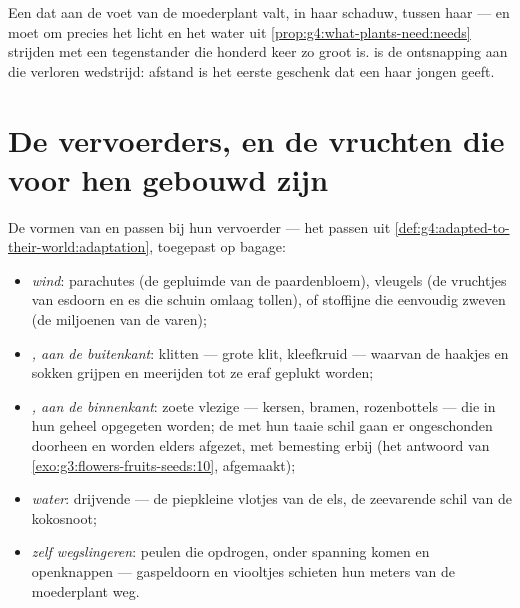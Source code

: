 \begin{example}\label{ex:g6:how-plants-spread:whyleave}
Een  dat aan de voet van de moederplant valt,  in haar
schaduw, tussen haar  --- en moet om precies het licht en het
water uit \cref{prop:g4:what-plants-need:needs} strijden met een
tegenstander die honderd keer zo groot is.  is de ontsnapping
aan die verloren wedstrijd: afstand is het eerste geschenk dat een 
haar jongen geeft.
\end{example}

\section{De vervoerders, en de vruchten die voor hen gebouwd zijn}

\begin{proposition}\label{prop:g6:how-plants-spread:builds}
De vormen van  en  passen bij hun vervoerder --- het passen
uit \cref{def:g4:adapted-to-their-world:adaptation}, toegepast op bagage:
\begin{itemize}
  \item \emph{wind}: parachutes (de gepluimde  van de
        paardenbloem), vleugels (de vruchtjes van esdoorn en es die
        schuin omlaag tollen), of stoffijne  die eenvoudig zweven
        (de miljoenen van de varen);
  \item \emph{, aan de buitenkant}: klitten --- grote klit,
        kleefkruid --- waarvan de haakjes  en sokken grijpen en
        meerijden tot ze eraf geplukt worden;
  \item \emph{, aan de binnenkant}: zoete vlezige  ---
        kersen, bramen, rozenbottels --- die in hun geheel opgegeten
        worden; de  met hun taaie schil gaan er ongeschonden
        doorheen en worden elders afgezet, met bemesting erbij
        (het antwoord van \cref{exo:g3:flowers-fruits-seeds:10},
        afgemaakt);
  \item \emph{water}: drijvende  --- de piepkleine vlotjes van
        de els, de zeevarende schil van de kokosnoot;
  \item \emph{zelf wegslingeren}: peulen die opdrogen, onder spanning
        komen en openknappen --- gaspeldoorn en viooltjes schieten hun
         meters van de moederplant weg.
\end{itemize}
\end{proposition}
\admitted

